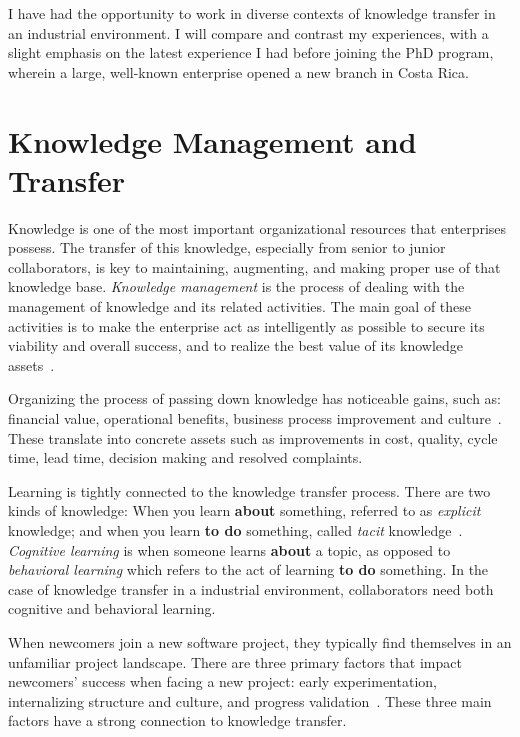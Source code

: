 \documentclass[12pt, letterpaper]{article}
\begin{document}
I have had the opportunity to work in diverse contexts of knowledge transfer in 
an industrial environment. I will compare and contrast my experiences, with a slight emphasis on the 
latest experience I had before joining the PhD program, wherein a large, well-known enterprise 
opened a new branch in Costa Rica.

\section{Knowledge Management and Transfer}
Knowledge is one of the most important organizational resources that enterprises possess.
The transfer of this knowledge, especially from senior to junior collaborators, 
is key to maintaining, augmenting, and
making proper use of that knowledge base. 
\textit{Knowledge management}
is the process of dealing with the management 
of knowledge and its related activities. 
The main goal of these activities is to make the enterprise act as intelligently as possible to secure its viability and overall success, and
to realize the best value of its knowledge assets~\cite{wiig97}.

Organizing the process of passing down knowledge has noticeable gains, 
such as: financial
value, operational benefits, business process improvement and culture~\cite{ibrahim09}. These translate into concrete assets such as
improvements in cost, quality, cycle time, lead time, decision making and resolved complaints.

Learning is tightly connected to the knowledge transfer
process.
There are two kinds of knowledge: When you learn \textbf{about} something, referred to as \textit{explicit} 
knowledge; and when you learn \textbf{to do} something, called \textit{tacit} knowledge~\cite{cook99}. 
\textit{Cognitive learning} is when someone learns \textbf{about} a topic, as opposed to 
\textit{behavioral learning} which refers to the act of learning \textbf{to do} something.
In the case of knowledge transfer in a industrial environment, collaborators need both cognitive and
behavioral learning.

When newcomers join a new software project, they typically find themselves in an
unfamiliar project
landscape.
There are three primary factors that impact newcomers'
success when facing a new project: early experimentation, internalizing structure
and culture, and progress validation~\cite{Dagenais10}. These three main factors
have a strong connection to knowledge transfer. 
\end{document}
